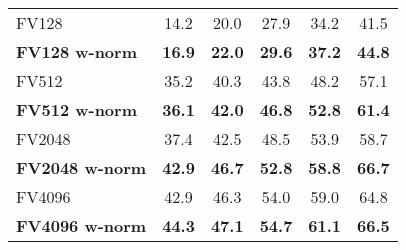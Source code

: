 \begin{tabularx}{0.864\linewidth}{|l|c c c c c|}
		\hline
		\rowcolor{maroon!10}
		FV128                 	&14.2     &20.0     &27.9     &34.2     &41.5 \\
		\rowcolor{maroon!10}
		\textbf{FV128 w-norm}              	&\textbf{16.9}     &\textbf{22.0}     &\textbf{29.6}     &\textbf{37.2}     &\textbf{44.8} \\  
	    \hline  
		\rowcolor{maroon!10}
		FV512					&35.2      &40.3       &43.8      &48.2      &57.1 \\
		\rowcolor{maroon!10}
		\textbf{FV512 w-norm}	&\textbf{36.1}       &\textbf{42.0}      &\textbf{46.8}       &\textbf{52.8}       &\textbf{61.4} \\ 
	    \hline   
    	\rowcolor{maroon!10}
    	FV2048             		&37.4       &42.5       &48.5       &53.9       &58.7 	\\
    	\rowcolor{maroon!10}
		\textbf{FV2048 w-norm} 	&\textbf{42.9}       &\textbf{46.7}       &\textbf{52.8}       &\textbf{58.8}       &\textbf{66.7} \\
	    \rowcolor{maroon!10}
	    \hline   
	    FV4096            	&42.9     &46.3     &54.0     &59.0    &64.8   \\ 
	    \rowcolor{maroon!10}
	    \textbf{FV4096 w-norm} 		&\textbf{44.3}      &\textbf{47.1}      &\textbf{54.7}      &\textbf{61.1}      &\textbf{66.5} 	\\
	    \hline
\end{tabularx}

